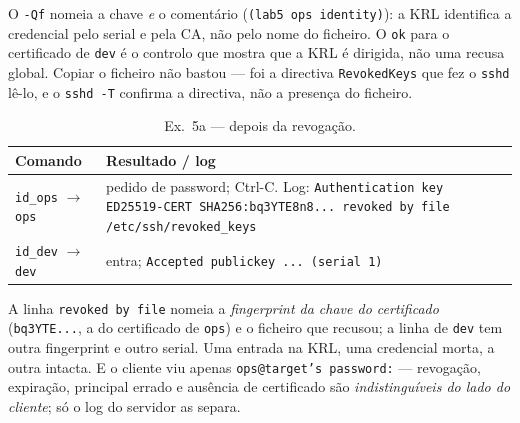 \documentclass[a4paper,11pt]{article}
\newcommand{\cmd}[1]{\textcolor{sscnblue}{\texttt{#1}}}
\begin{document}
O \cmd{-Qf} nomeia a chave \emph{e} o coment\'ario (\cmd{(lab5 ops identity)}): a KRL
identifica a credencial pelo serial e pela CA, n\~ao pelo nome do ficheiro. O \cmd{ok}
para o certificado de \cmd{dev} \'e o controlo que mostra que a KRL \'e dirigida, n\~ao
uma recusa global. Copiar o ficheiro n\~ao bastou --- foi a directiva \cmd{RevokedKeys}
que fez o \cmd{sshd} l\^e-lo, e o \cmd{sshd -T} confirma a directiva, n\~ao a presen\c{c}a
do ficheiro.

\begin{table}[H]
\centering\small
\caption{Ex.\ 5a --- depois da revoga\c{c}\~ao.}
\begin{tabularx}{\linewidth}{@{}l X@{}}
\toprule
\textbf{Comando} & \textbf{Resultado / log} \\
\midrule
\cmd{id\_ops} $\rightarrow$ \cmd{ops} & pedido de password; Ctrl-C. Log:
  \cmd{Authentication key ED25519-CERT SHA256:bq3YTE8n8... revoked by file
  /etc/ssh/revoked\_keys} \\
\cmd{id\_dev} $\rightarrow$ \cmd{dev} & entra; \cmd{Accepted publickey ... (serial 1)} \\
\bottomrule
\end{tabularx}
\end{table}

A linha \cmd{revoked by file} nomeia a \emph{fingerprint da chave do certificado}
(\cmd{bq3YTE...}, a do certificado de \cmd{ops}) e o ficheiro que recusou; a linha de
\cmd{dev} tem outra fingerprint e outro serial. Uma entrada na KRL, uma credencial morta,
a outra intacta. E o cliente viu apenas \cmd{ops@target's password:} --- revoga\c{c}\~ao,
expira\c{c}\~ao, principal errado e aus\^encia de certificado s\~ao
\emph{indistingu\'iveis do lado do cliente}; s\'o o log do servidor as separa.
\end{document}
